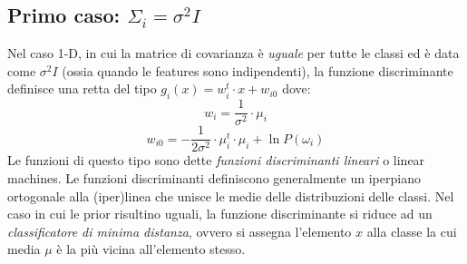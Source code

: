 \documentclass[a4paper,oneside,titlepage]{book}
\begin{document}
\subsection{Primo caso: \texorpdfstring{$\Sigma_i = \sigma^2 I$}{1-D}}
Nel caso 1-D, in cui la matrice di covarianza è \textit{uguale} per tutte le classi ed è data come $\sigma^2 I$ (ossia quando le features sono indipendenti), la funzione discriminante definisce una retta del tipo $g_i(x) = w_i^t \cdot x + w_{i0}$ dove:
\[ w_i = \frac{1}{\sigma^2} \cdot \mu_i \]
\[ w_{i0} = - \frac{1}{2 \sigma^2} \cdot \mu_i^t \cdot \mu_i + \ln P(\omega_i) \]
Le funzioni di questo tipo sono dette \textit{funzioni discriminanti lineari} o linear machines. Le funzioni discriminanti definiscono generalmente un iperpiano ortogonale alla (iper)linea che unisce le medie delle distribuzioni delle classi. Nel caso in cui le prior risultino uguali, la funzione discriminante si riduce ad un \textit{classificatore di minima distanza}, ovvero si assegna l'elemento $x$ alla classe la cui media $\mu$ è la più vicina all'elemento stesso.
\end{document}
